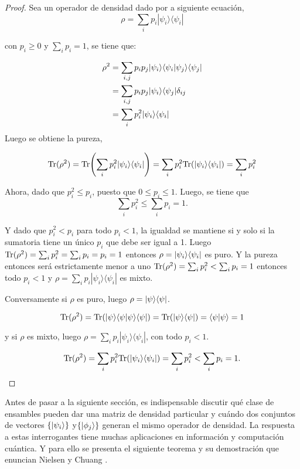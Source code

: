 \begin{proof}
	Sea un operador de densidad dado por a siguiente ecuación, \[\rho=\sum_i p_i |\psi_i\rangle \langle \psi_i|\]
	
	con $p_i\ge 0$ y $\sum_{i}p_i=1$, se tiene que:
	
	\begin{equation*}
		\begin{split}
			\rho^2&=\sum_{i,j} p_i p_j|\psi_i\rangle \langle \psi_i|\psi_j\rangle \langle \psi_j|\\
			&=\sum_{i,j} p_i p_j|\psi_i \rangle \langle \psi_j|\delta_{ij}\\
			&=\sum_i p_i^2|\psi_i \rangle \langle \psi_i|
			\end{split}
	\end{equation*}
	Luego se obtiene la pureza,
	
	\[{\rm Tr}(\rho^2)={\rm Tr}{\left(\sum_i p_i^2|\psi_i \rangle \langle \psi_i|\right)}=\sum_i p_i^2 {\rm Tr}(|\psi_i \rangle \langle\psi_i|)=\sum_i p_i^2\]
	
	Ahora, dado que $p_i^2 \le p_i $, puesto que $0 \le p_i \le 1$. Luego, se tiene que \[\sum_i p_i^2\le\sum_i p_i=1.\]
	
   Y dado que $p_i^2<p_i$ para todo $p_i<1$, la igualdad se mantiene si y solo si la sumatoria tiene un único $p_i$ que debe ser igual a 1. Luego 	${\rm Tr}(\rho^2)=\sum_{i}p_i^2=\sum_i p_i= p_i=1$ entonces $\rho=|\psi_i\rangle \langle\psi_i|$ es puro. Y la pureza entonces será estrictamente menor a uno  ${\rm Tr}(\rho^2)=\sum_{i}p_i^2<\sum_i p_i=1$ entonces todo $p_i<1$ y $\rho=\sum_i p_i |\psi_i\rangle \langle \psi_i|$ es mixto.
    
     
	Conversamente si $\rho $ es puro, luego $\rho=|\psi\rangle \langle \psi|$.
	
	\[{\rm Tr}(\rho^2)={\rm Tr}(|\psi\rangle \langle \psi|\psi\rangle \langle \psi|)={\rm Tr}(|\psi\rangle \langle \psi|)=\langle\psi|\psi\rangle=1\]
	
	y si $\rho $ es mixto, luego $\rho=\sum_i p_i|\psi_i\rangle \langle \psi_i|$, con todo $p_i<1$.
	
	
	
	\[{\rm Tr}(\rho^2)=\sum_i p_i^2 {\rm Tr}(|\psi_i \rangle \langle\psi_i|)=\sum_i p_i^2<\sum_i p_i=1.\]
	\end{proof}



Antes de pasar a la siguiente sección, es indispensable discutir qué clase de ensambles pueden dar una matriz de densidad particular y cuándo dos conjuntos de vectores $\{|\psi_i\rangle\}$ y$ \{|\phi_j\rangle \}$ generan el mismo operador de densidad. La respuesta a estas interrogantes tiene muchas aplicaciones en información y computación cuántica. Y para ello se presenta el siguiente teorema y su demostración que enuncian Nielsen y Chuang {\cite{nielsen_chuang_2010}}.




